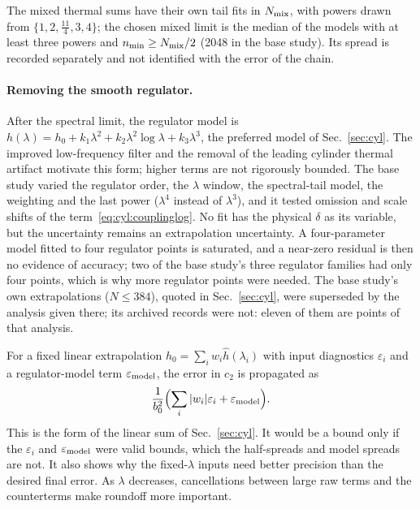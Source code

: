 \documentclass[11pt,a4paper]{article}
\numberwithin{equation}{section}
\begin{document}
The mixed thermal sums have their own tail fits in $N_{\rm mix}$, with powers drawn from $\{1,2,\frac{11}4,3,4\}$; the
chosen mixed limit is the median of the models with at least three powers and $n_{\min}\ge N_{\rm mix}/2$ (2048 in the
base study). Its spread is recorded separately and not identified with the error of the chain.

\paragraph{Removing the smooth regulator.} After the spectral limit, the regulator model is
$h(\lambda)=h_0+k_1\lambda^2+k_2\lambda^2\log\lambda+k_3\lambda^3$, the preferred model of Sec.~\ref{sec:cyl}. The
improved low-frequency filter and the removal of the leading cylinder thermal artifact motivate this form; higher terms
are not rigorously bounded. The base study varied the regulator order, the $\lambda$ window, the spectral-tail model,
the weighting and the last power ($\lambda^4$ instead of $\lambda^3$), and it tested omission and scale shifts of the
term~\eqref{eq:cyl:couplinglog}. No fit has the physical $\delta$ as its variable, but the uncertainty remains an
extrapolation uncertainty. A four-parameter model fitted to four regulator points is saturated, and a near-zero residual
is then no evidence of accuracy; two of the base study's three regulator families had only four points, which is why more
regulator points were needed. The base study's own extrapolations ($N\le384$), quoted in Sec.~\ref{sec:cyl}, were
superseded by the analysis given there; its archived records were not: eleven of them are points of that analysis.

For a fixed linear extrapolation $\hat h_0=\sum_iw_i\hat h(\lambda_i)$ with input diagnostics $\varepsilon_i$ and a
regulator-model term $\varepsilon_{\rm model}$, the error in $c_2$ is propagated as
\begin{equation}
 \frac1{b_0^2}\Bigl(\sum_i|w_i|\varepsilon_i+\varepsilon_{\rm model}\Bigr).
 \label{eq:cyl:budget}
\end{equation}
This is the form of the linear sum of Sec.~\ref{sec:cyl}. It would be a bound only if the $\varepsilon_i$ and
$\varepsilon_{\rm model}$ were valid bounds, which the half-spreads and model spreads are not. It also shows why the
fixed-$\lambda$ inputs need better precision than the desired final error. As $\lambda$ decreases, cancellations between
large raw terms and the counterterms make roundoff more important.

\end{document}
